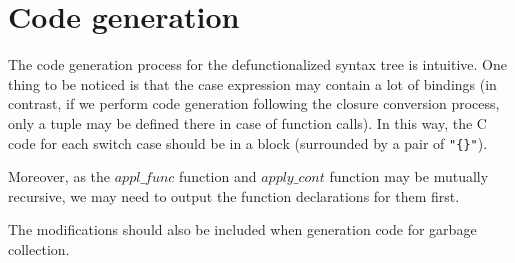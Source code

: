 \documentclass{article}
\theoremstyle{definition}
\theoremstyle{remark}
\numberwithin{equation}{section}
\begin{document}
\restoregeometry

\section{Code generation}

The code generation process for the defunctionalized syntax tree is intuitive.
One thing to be noticed is that the \textsf{case} expression may contain a lot of
bindings (in contrast, if we perform code generation following the closure conversion
process, only a tuple may be defined there in case of function calls).
In this way, the C code for each switch case should be in a block (surrounded by
a pair of \texttt{"\{\}"}).

Moreover, as the $appl\_func$ function and $apply\_cont$ function may be
 mutually recursive, we may need to output the function declarations for them first.

The modifications should also be included when generation code for garbage collection.\\\\

\end{document}
